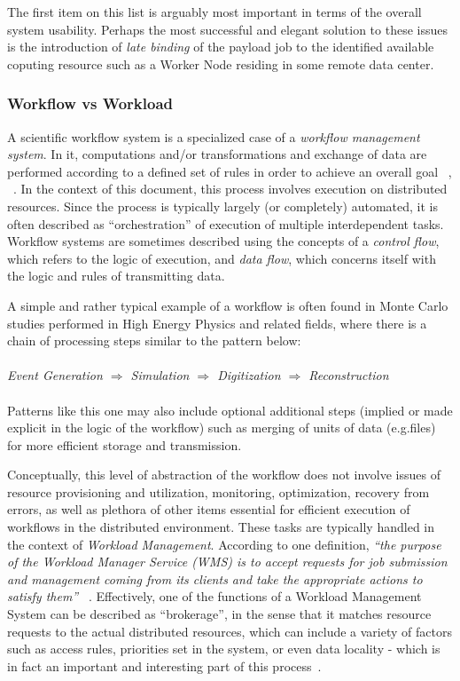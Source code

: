 The first item on this list is arguably most important in terms of the overall system usability. Perhaps the most successful and elegant solution to these issues is the introduction of \textit{late binding}
of the payload job to the identified available coputing resource such as a Worker Node residing in some remote data center.

\subsubsection{Workflow vs Workload}

A scientific workflow system is a specialized case of a \textit{workflow management system}. In it, computations and/or transformations and exchange of data are performed according to a defined set of rules
in order to achieve an overall goal ~\cite{grid_workflow_taxonomy}, ~\cite{grid_workflow_fit}. In the context of this document, this process involves execution on distributed resources. Since the process is
typically largely (or completely) automated, it is often described as ``orchestration'' of execution of multiple interdependent tasks. Workflow systems are sometimes described using the concepts of a \textit{control flow},
which refers to the logic of execution, and \textit{data flow}, which concerns itself with the logic and rules of transmitting data.

A simple and rather typical example of a workflow is often found in Monte Carlo studies performed in High Energy Physics and related fields, where there is a chain of processing steps similar to the pattern below:
\\
\\
\textit{Event  Generation $\Longrightarrow$ Simulation $\Longrightarrow$ Digitization $\Longrightarrow$ Reconstruction}
\\
\\
Patterns like this one may also include optional additional steps (implied or made explicit in the logic of the workflow) such as merging of units of data (e.g.files) for more efficient storage and transmission.

Conceptually, this level of abstraction of the workflow does not  involve issues of resource provisioning and utilization, monitoring, optimization, recovery from errors, as well as plethora of other items essential
for efficient execution of workflows in the distributed environment. These tasks are typically handled in the context of \textit{Workload Management}. According to one definition,
\textit{``the purpose of the Workload Manager Service (WMS) is to accept requests for job submission and management coming from its clients and take the appropriate actions to satisfy them''} ~\cite{egee_user_guide}.
Effectively, one of the functions of a Workload Management System can be described as ``brokerage'', in the sense that it matches resource requests to the actual distributed resources, which can include a
variety of factors such as access rules, priorities set in the system, or even data locality - which is in fact an important and interesting part of this process~\cite{panda_chep10}.

